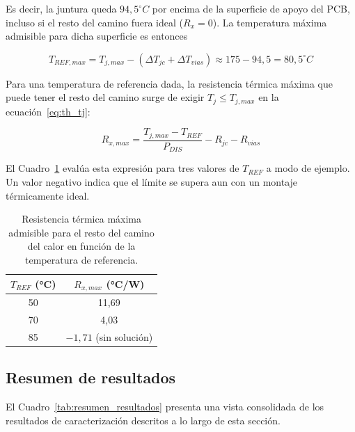 Es decir, la juntura queda $94,5^\circ C$ por encima de la superficie de apoyo del PCB, incluso si el resto del camino fuera ideal ($R_x = 0$). La temperatura máxima admisible para dicha superficie es entonces

\begin{equation}
    T_{REF,max} = T_{j,max} - \left(\Delta T_{jc} + \Delta T_{vias}\right) \approx 175 - 94,5 = 80,5^\circ C
    \label{eq:th_trefmax}
\end{equation}

Para una temperatura de referencia dada, la resistencia térmica máxima que puede tener el resto del camino surge de exigir $T_j \leq T_{j,max}$ en la ecuación~\eqref{eq:th_tj}:

\begin{equation}
    R_{x,max} = \frac{T_{j,max} - T_{REF}}{P_{DIS}} - R_{jc} - R_{vias}
    \label{eq:th_rxmax}
\end{equation}

El Cuadro~\ref{tab:th_rxmax} evalúa esta expresión para tres valores de $T_{REF}$ a modo de ejemplo. Un valor negativo indica que el límite se supera aun con un montaje térmicamente ideal. 

\begin{table}[H]
    \centering
    \caption{Resistencia térmica máxima admisible para el resto del camino del calor en función de la temperatura de referencia.}
    \label{tab:th_rxmax}
    \begin{tabular}{cc}
        \hline\hline
        \textbf{$T_{REF}$ (°C)} & \textbf{$R_{x,max}$ (°C/W)} \\
        \hline
        50 & 11,69 \\
        \hline
        70 & 4,03 \\
        \hline
        85 & $-1,71$ (sin solución) \\
        \hline\hline
    \end{tabular}
\end{table}

\subsection{Resumen de resultados}
El Cuadro~\ref{tab:resumen_resultados} presenta una vista consolidada de los resultados de caracterización descritos a lo largo de esta sección.

